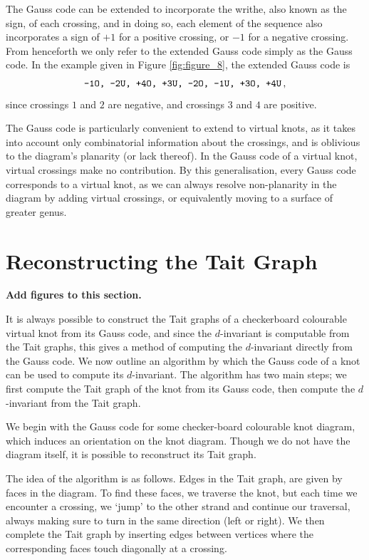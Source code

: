 \documentclass[12pt]{report}
\newcommand{\notered}[1]{{\color{Red} \textbf{#1}}}
\begin{document}
The Gauss code can be extended to incorporate the writhe, also known as the sign, of each crossing, and in doing so, each element of the sequence also incorporates a sign of $+1$ for a positive crossing, or $-1$ for a negative crossing. From henceforth we only refer to the extended Gauss code simply as the Gauss code. In the example given in Figure \ref{fig:figure_8}, the extended Gauss code is 
\[\text{\ttfamily-1O,\ -2U,\ +4O,\ +3U,\ -2O,\ -1U,\ +3O,\ +4U}\,,\]
since crossings $1$ and $2$ are negative, and crossings $3$ and $4$ are positive.

The Gauss code is particularly convenient to extend to virtual knots, as it takes into account only combinatorial information about the crossings, and is oblivious to the diagram's planarity (or lack thereof). In the Gauss code of a virtual knot, virtual crossings make no contribution. By this generalisation, every Gauss code corresponds to a virtual knot, as we can always resolve non-planarity in the diagram by adding virtual crossings, or equivalently moving to a surface of greater genus.

\section{Reconstructing the Tait Graph}

\notered{Add figures to this section.}

It is always possible to construct the Tait graphs of a checkerboard colourable virtual knot from its Gauss code, and since the $d$-invariant is computable from the Tait graphs, this gives a method of computing the $d$-invariant directly from the Gauss code. We now outline an algorithm by which the Gauss code of a knot can be used to compute its $d$-invariant. The algorithm has two main steps; we first compute the Tait graph of the knot from its Gauss code, then compute the $d$-invariant from the Tait graph.

We begin with the Gauss code for some checker-board colourable knot diagram, which induces an orientation on the knot diagram. Though we do not have the diagram itself, it is possible to reconstruct its Tait graph.
	
	The idea of the algorithm is as follows. Edges in the Tait graph, are given by faces in the diagram. To find these faces, we traverse the knot, but each time we encounter a crossing, we `jump' to the other strand and continue our traversal, always making sure to turn in the same direction (left or right). We then complete the Tait graph by inserting edges between vertices where the corresponding faces touch diagonally at a crossing.
	
\end{document}
